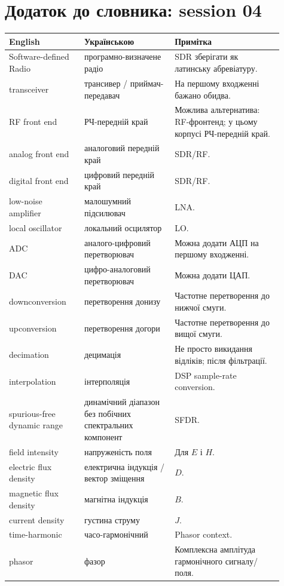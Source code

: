 \chapter{Додаток до словника: session 04}

\begin{longtable}{L{0.25\linewidth}L{0.30\linewidth}L{0.36\linewidth}}
\toprule
\textbf{English} & \textbf{Українською} & \textbf{Примітка}\\
\midrule
Software-defined Radio & програмно-визначене радіо & SDR зберігати як латинську абревіатуру.\\
transceiver & трансивер / приймач-передавач & На першому входженні бажано обидва.\\
RF front end & РЧ-передній край & Можлива альтернатива: RF-фронтенд; у цьому корпусі РЧ-передній край.\\
analog front end & аналоговий передній край & SDR/RF.\\
digital front end & цифровий передній край & SDR/RF.\\
low-noise amplifier & малошумний підсилювач & LNA.\\
local oscillator & локальний осцилятор & LO.\\
ADC & аналого-цифровий перетворювач & Можна додати АЦП на першому входженні.\\
DAC & цифро-аналоговий перетворювач & Можна додати ЦАП.\\
downconversion & перетворення донизу & Частотне перетворення до нижчої смуги.\\
upconversion & перетворення догори & Частотне перетворення до вищої смуги.\\
decimation & децимація & Не просто викидання відліків; після фільтрації.\\
interpolation & інтерполяція & DSP sample-rate conversion.\\
spurious-free dynamic range & динамічний діапазон без побічних спектральних компонент & SFDR.\\
field intensity & напруженість поля & Для $E$ і $H$.\\
electric flux density & електрична індукція / вектор зміщення & $D$.\\
magnetic flux density & магнітна індукція & $B$.\\
current density & густина струму & $J$.\\
time-harmonic & часо-гармонічний & Phasor context.\\
phasor & фазор & Комплексна амплітуда гармонічного сигналу/поля.\\

\end{longtable}
